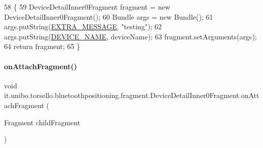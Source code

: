 \begin{DoxyCode}
58                                                                             \{
59         DeviceDetailInner0Fragment fragment = \textcolor{keyword}{new} DeviceDetailInner0Fragment();
60         Bundle args = \textcolor{keyword}{new} Bundle();
61         args.putString(\hyperlink{classit_1_1unibo_1_1torsello_1_1bluetoothpositioning_1_1fragment_1_1DeviceDetailInner0Fragment_aa3b3a2d88a7d6c614f87cdb6cee5c4b8_aa3b3a2d88a7d6c614f87cdb6cee5c4b8}{EXTRA\_MESSAGE}, \textcolor{stringliteral}{"testing"});
62         args.putString(\hyperlink{classit_1_1unibo_1_1torsello_1_1bluetoothpositioning_1_1fragment_1_1DeviceDetailInner0Fragment_ab2957d43ea532c398e82aceec148fc06_ab2957d43ea532c398e82aceec148fc06}{DEVICE\_NAME}, deviceName);
63         fragment.setArguments(args);
64         \textcolor{keywordflow}{return} fragment;
65     \}
\end{DoxyCode}
\hypertarget{classit_1_1unibo_1_1torsello_1_1bluetoothpositioning_1_1fragment_1_1DeviceDetailInner0Fragment_a0893d44029c05595acc4cbe5bb458772_a0893d44029c05595acc4cbe5bb458772}{}\label{classit_1_1unibo_1_1torsello_1_1bluetoothpositioning_1_1fragment_1_1DeviceDetailInner0Fragment_a0893d44029c05595acc4cbe5bb458772_a0893d44029c05595acc4cbe5bb458772} 
\paragraph{\texorpdfstring{on\+Attach\+Fragment()}{onAttachFragment()}}
{\footnotesize\ttfamily void it.\+unibo.\+torsello.\+bluetoothpositioning.\+fragment.\+Device\+Detail\+Inner0\+Fragment.\+on\+Attach\+Fragment (\begin{DoxyParamCaption}\item[{Fragment}]{child\+Fragment }\end{DoxyParamCaption})}


